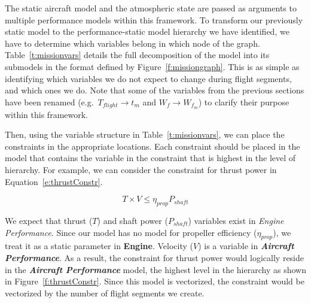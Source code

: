 The static aircraft model and the atmospheric state are passed as arguments to multiple
performance models within this framework. To transform our previously static model to
the performance-static model hierarchy we have identified,
we have to determine which variables
belong in which node of the graph. Table~\ref{t:missionvars} details the full
decomposition of the model into its submodels in the format defined
by Figure~\ref{f:missiongraph}. This is as simple as identifying which variables
we do not expect to change during flight segments, and which ones we do. Note that
some of the variables from the previous sections
have been renamed (e.g.\ $T_{flight} \rightarrow t_m$ and $W_f \rightarrow W_{f_m}$)
to clarify their purpose within this framework.

\begin{center}
    
    \label{t:missionvars}
\end{center}

Then, using the variable structure in Table~\ref{t:missionvars}, we can place the
constraints in the appropriate locations. Each constraint should be placed
in the model that contains the variable in the constraint that is highest in the level of hierarchy. For example,
we can consider the constraint for thrust power in Equation~\ref{e:thrustConstr}.

\begin{equation}
    \label{e:thrustConstr}
    T \times V \leq \eta_{prop} P_{shaft}
\end{equation}

We expect that thrust ($T$) and shaft power ($P_{shaft}$) variables exist
in \textit{Engine Performance}. Since our model has no model for propeller efficiency ($\eta_{prop}$), we treat it
as a static parameter in \textbf{Engine}. Velocity ($V$) is a variable in \textbf{\textit{Aircraft {Performance}}}.
As a result, the constraint for thrust power would logically reside in the \textbf{\textit{Aircraft {Performance}}}
model, the highest level in the hierarchy as shown in Figure~\ref{f:thrustConstr}. Since this model is vectorized,
the constraint would be vectorized by the number of flight segments we create.

